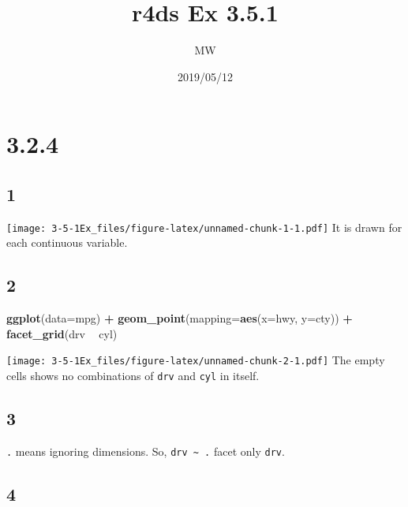 \documentclass[]{article}
\title{r4ds Ex 3.5.1}
\author{MW}
\date{2019/05/12}
\newenvironment{Shaded}{\begin{snugshade}}{\end{snugshade}}
\newcommand{\DataTypeTok}[1]{\textcolor[rgb]{0.13,0.29,0.53}{#1}}
\newcommand{\KeywordTok}[1]{\textcolor[rgb]{0.13,0.29,0.53}{\textbf{#1}}}
\newcommand{\NormalTok}[1]{#1}
\newcommand{\OperatorTok}[1]{\textcolor[rgb]{0.81,0.36,0.00}{\textbf{#1}}}
\newcommand{\StringTok}[1]{\textcolor[rgb]{0.31,0.60,0.02}{#1}}
\begin{document}
\maketitle

\hypertarget{section}{%
\section{3.2.4}\label{section}}

\hypertarget{section-1}{%
\subsection{1}\label{section-1}}

\texttt{[image: 3-5-1Ex\_files/figure-latex/unnamed-chunk-1-1.pdf]} It is
drawn for each continuous variable.

\hypertarget{section-2}{%
\subsection{2}\label{section-2}}

\begin{Shaded}
\begin{Highlighting}[]
\KeywordTok{ggplot}\NormalTok{(}\DataTypeTok{data=}\NormalTok{mpg) }\OperatorTok{+}
\StringTok{    }\KeywordTok{geom_point}\NormalTok{(}\DataTypeTok{mapping=}\KeywordTok{aes}\NormalTok{(}\DataTypeTok{x=}\NormalTok{hwy, }\DataTypeTok{y=}\NormalTok{cty)) }\OperatorTok{+}
\StringTok{    }\KeywordTok{facet_grid}\NormalTok{(drv }\OperatorTok{~}\StringTok{ }\NormalTok{cyl)}
\end{Highlighting}
\end{Shaded}

\texttt{[image: 3-5-1Ex\_files/figure-latex/unnamed-chunk-2-1.pdf]} The
empty cells shows no combinations of \texttt{drv} and \texttt{cyl} in
itself.

\hypertarget{section-3}{%
\subsection{3}\label{section-3}}

\texttt{.} means ignoring dimensions. So,
\texttt{drv\ \textasciitilde{}\ .} facet only \texttt{drv}.

\hypertarget{section-4}{%
\subsection{4}\label{section-4}}
\end{document}
